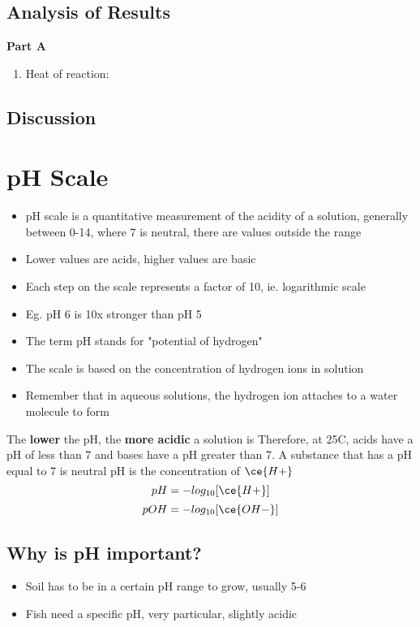 	\subsection{Analysis of Results}
		\textbf{Part A}
		\begin{enumerate}
			\item Heat of reaction:
		\end{enumerate}
	\subsection{Discussion}

\newpage

\section{pH Scale} \label{17/02/2025}
	\begin{itemize}
		\item pH scale is a quantitative measurement of the acidity of a solution, generally between 0-14, where 7 is neutral, there are values outside the range
		\item Lower values are acids, higher values are basic
		\item Each step on the scale represents a factor of 10, ie. logarithmic scale
		\item Eg. pH 6 is 10x stronger than pH 5
		\item The term pH stands for "potential of hydrogen"
		\item The scale is based on the concentration of hydrogen ions in solution
		\item Remember that in aqueous solutions, the hydrogen ion attaches to a water molecule to form
	\end{itemize}
	The \textbf{lower} the pH, the \textbf{more acidic} a solution is
	Therefore, at 25\degree C, acids have a pH of less than 7 and bases have a pH greater than 7. A substance that has a pH equal to 7 is neutral
	pH is the concentration of $\ce{H+}$
	$$pH = -log_{10}{[\ce{H+}]}$$
	$$pOH = -log_{10}{[\ce{OH-}]}$$
	
	\subsection{Why is pH important?}
		\begin{itemize}
			\item Soil has to be in a certain pH range to grow, usually 5-6
			\item Fish need a specific pH, very particular, slightly acidic
		\end{itemize}
	
